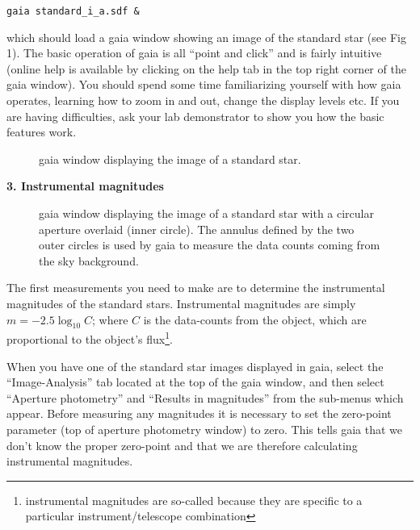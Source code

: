{\tt \verb,gaia standard_i_a.sdf &,}

which should load a {\sc gaia} window showing an image of the standard
star (see Fig 1). The basic operation of {\sc gaia} is all ``point and
click'' and is fairly intuitive (online help is available by
clicking on the {\sc help} tab in the top right corner of the {\sc
gaia} window). You should spend some time familiarizing yourself with
how {\sc gaia} operates, learning how to zoom in and out, change the
display levels etc. If you are having difficulties, ask your lab
demonstrator to show you how the basic features work.

\newpage

\begin{figure}
\centerline{}
\caption{{\sc gaia} window displaying the image of a standard star.}
\end{figure}

{\large{\bf 3. Instrumental magnitudes}}\\
\begin{figure}
\centerline{}
\caption{{\sc gaia} window displaying the image of a standard star
with a circular aperture overlaid (inner circle). The annulus defined
by the two outer circles is used by {\sc gaia} to measure the data
counts coming from the sky background.}
\end{figure}
The first measurements you need to make are to determine the
instrumental magnitudes of the standard stars. Instrumental magnitudes
are simply $m = -2.5\log_{10} C$; where $C$ is the data-counts from
the object, which are proportional to the object's
flux\footnote{instrumental magnitudes are so-called because they
are specific to a particular instrument/telescope combination}. 

When you have one of the standard star images displayed 
in {\sc gaia}, select the ``Image-Analysis'' tab located at
the top of the {\sc gaia} window, and then select ``Aperture photometry''
and ``Results in magnitudes'' from the sub-menus which appear. 
Before measuring any magnitudes it is necessary to set 
the zero-point parameter (top of aperture photometry window) to zero. 
This tells {\sc gaia} that we don't know the proper zero-point and
that we are therefore calculating instrumental magnitudes. 


